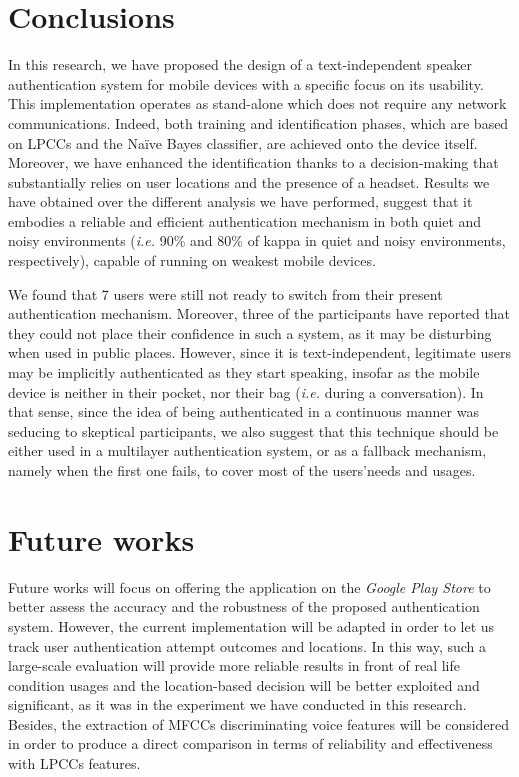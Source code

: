 \documentclass[cryptography,article,submit,moreauthors,pdftex,10pt,a4paper]{mdpi}
\begin{document}
\section{Conclusions}

In this research, we have proposed the design of a text-independent speaker authentication system for mobile devices with a specific focus on its usability. This implementation operates as stand-alone which does not require any network communications. Indeed, both training and identification phases, which are based on LPCCs and the Na\"ive Bayes classifier, are achieved onto the device itself. Moreover, we have enhanced the identification thanks to a decision-making that substantially relies on user locations and the presence of a headset. Results we have obtained over the different analysis we have performed, suggest that it embodies a reliable and efficient authentication mechanism in both quiet and noisy environments (\textit{i.e.} 90\% and 80\% of kappa in quiet and noisy environments, respectively), capable of running on weakest mobile devices. 

We found that 7 users were still not ready to switch from their present authentication mechanism. Moreover, three of the participants have reported that they could not place their confidence in such a system, as it may be disturbing when used in public places. However, since it is text-independent, legitimate users may be implicitly authenticated as they start speaking, insofar as the mobile device is neither in their pocket, nor their bag (\textit{i.e.} during a conversation). In that sense, since the idea of being authenticated in a continuous manner was seducing to skeptical  participants, we also suggest that this technique should be either used in a multilayer authentication system, or as a fallback mechanism, namely when the first one fails, to cover most of the users\textquoteright needs and usages.

\section{Future works}

Future works will focus on offering the application on the \textit{Google Play Store} to better assess the accuracy and the robustness of the proposed authentication system. However, the current implementation will be adapted in order to let us track user authentication attempt outcomes and locations. In this way, such a large-scale evaluation will provide more reliable results in front of real life condition usages and the location-based decision will be better exploited and significant, as it was in the experiment we have conducted in this research. Besides, the extraction of MFCCs discriminating voice features will be considered in order to produce a direct comparison in terms of reliability and effectiveness with LPCCs features.
\end{document}
